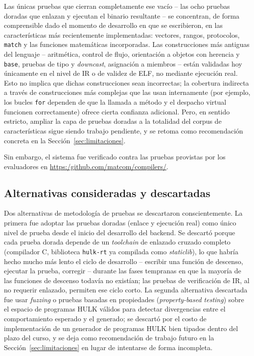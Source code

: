 \documentclass[12pt, a4paper]{article}
\begin{document}
Las únicas pruebas que cierran completamente ese vacío -- las ocho pruebas
doradas que enlazan y ejecutan el binario resultante -- se concentran, de
forma comprensible dado el momento de desarrollo en que se escribieron, en las
características más recientemente implementadas: vectores, rangos,
protocolos, \texttt{match} y las funciones matemáticas incorporadas. Las
construcciones más antiguas del lenguaje -- aritmética, control de flujo,
orientación a objetos con herencia y \texttt{base}, pruebas de tipo y
\textit{downcast}, asignación a miembros -- están validadas hoy únicamente en
el nivel de IR o de validez de ELF, no mediante ejecución real. Esto no
implica que dichas construcciones sean incorrectas; la cobertura indirecta a
través de construcciones más complejas que las usan internamente (por
ejemplo, los bucles \texttt{for} dependen de
que la llamada a método y el despacho virtual funcionen correctamente) ofrece
cierta confianza adicional. Pero, en sentido estricto, ampliar la capa de
pruebas doradas a la totalidad del corpus de características sigue siendo
trabajo pendiente, y se retoma como recomendación concreta en la
Sección~\ref{sec:limitaciones}.

Sin embargo, el sistema fue verificado contra las pruebas provistas por los evaluadores en \href{https:/github.com/matcom/compilers}{https:/github.com/matcom/compilers/}.

\subsection{Alternativas consideradas y descartadas}

Dos alternativas de metodología de pruebas se descartaron conscientemente.
La primera fue adoptar las pruebas doradas (enlace y ejecución real) como
único nivel de prueba desde el inicio del desarrollo del backend. Se descartó
porque cada prueba dorada depende de un \textit{toolchain} de enlazado
cruzado completo (compilador C, biblioteca \texttt{hulk-rt} ya compilada como
\textit{staticlib}), lo que habría hecho mucho más lento el ciclo de
desarrollo -- escribir una función de descenso, ejecutar la prueba, corregir
-- durante las fases tempranas en que la mayoría de las funciones de descenso
todavía no existían; las pruebas de verificación de IR, al no requerir
enlazado, permiten ese ciclo corto. La segunda alternativa descartada fue usar
\textit{fuzzing} o pruebas basadas en propiedades (\textit{property-based
testing}) sobre el espacio de programas HULK válidos para detectar
divergencias entre el comportamiento esperado y el generado; se descartó por
el costo de implementación de un generador de programas HULK bien tipados
dentro del plazo del curso, y se deja como recomendación de trabajo futuro en
la Sección~\ref{sec:limitaciones} en lugar de intentarse de forma incompleta.
\end{document}
